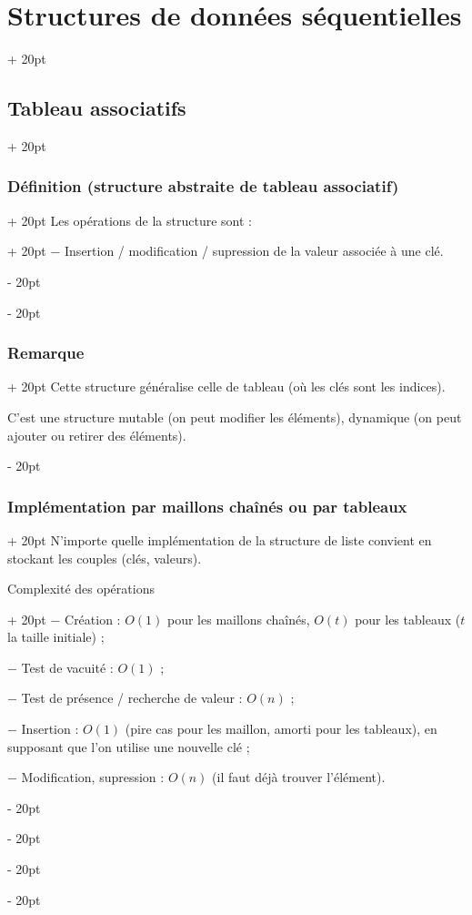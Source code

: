 \documentclass[a4paper, 12pt, twoside]{article}
\newcommand{\ind}[1][20pt]{\advance\leftskip + #1}
\newcommand{\deind}[1][20pt]{\advance\leftskip - #1}
\newenvironment{indt}[2][20pt]{#2 \par \ind[#1]}{\par \deind} %
\begin{document}
\begin{indt}{\section{Structures de données séquentielles}}
\begin{indt}{\subsection{Tableau associatifs}}
\begin{indt}{\subsubsection{Définition (structure abstraite de tableau associatif)}}
\begin{indt}{Les opérations de la structure sont :}
                    $-$ Insertion / modification / supression de la valeur associée à une clé.
                \end{indt}
            \end{indt}
            
            \vspace{6pt}
            
            \begin{indt}{\subsubsection{Remarque}}
                Cette structure généralise celle de tableau (où les clés sont les indices).
                
                C'est une structure mutable (on peut modifier les éléments), dynamique (on peut ajouter ou retirer des éléments).
            \end{indt}
            
            \vspace{6pt}
            
            \begin{indt}{\subsubsection{Implémentation par maillons chaînés ou par tableaux}}
                N'importe quelle implémentation de la structure de liste convient en stockant les couples (clés, valeurs).
                
                \begin{indt}{Complexité des opérations}
                    $-$ Création : $O(1)$ pour les maillons chaînés, $O(t)$ pour les tableaux ($t$ la taille initiale) ;
                    
                    $-$ Test de vacuité : $O(1)$ ;
                    
                    $-$ Test de présence / recherche de valeur : $O(n)$ ;
                    
                    $-$ Insertion : $O(1)$ (pire cas pour les maillon, amorti pour les tableaux), en supposant que l'on utilise une nouvelle clé ;
                    
                    $-$ Modification, supression : $O(n)$ (il faut déjà trouver l'élément).
                \end{indt}
                
                \vspace{6pt}
                

\end{indt}
\end{indt}
\end{indt}
\end{document}

